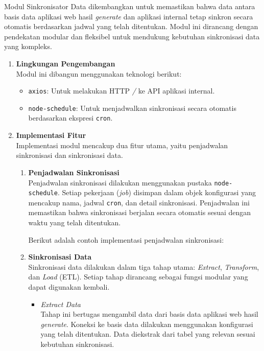 Modul Sinkronisator Data dikembangkan untuk memastikan bahwa data antara basis data aplikasi web hasil \textit{generate} dan aplikasi internal tetap sinkron secara otomatis berdasarkan jadwal yang telah ditentukan. Modul ini dirancang dengan pendekatan modular dan fleksibel untuk mendukung kebutuhan sinkronisasi data yang kompleks.

\begin{enumerate}[label*=\arabic*.,ref=\arabic*]
    \item \textbf{Lingkungan Pengembangan}\\
    Modul ini dibangun menggunakan teknologi berikut:
    \begin{itemize}
        \item \texttt{axios}: Untuk melakukan HTTP \textit{/} ke API aplikasi internal.
        \item \texttt{node-schedule}: Untuk menjadwalkan sinkronisasi secara otomatis berdasarkan ekspresi \texttt{cron}.
    \end{itemize}

    \item \textbf{Implementasi Fitur}\\
    Implementasi modul mencakup dua fitur utama, yaitu penjadwalan sinkronisasi dan sinkronisasi data.
        \begin{enumerate}[label=\alph*.]
            \item \textbf{Penjadwalan Sinkronisasi}\\
            Penjadwalan sinkronisasi dilakukan menggunakan pustaka \texttt{node-schedule}. Setiap pekerjaan (\textit{job}) disimpan dalam objek konfigurasi yang mencakup nama, jadwal \texttt{cron}, dan detail sinkronisasi. Penjadwalan ini memastikan bahwa sinkronisasi berjalan secara otomatis sesuai dengan waktu yang telah ditentukan.

            Berikut adalah contoh implementasi penjadwalan sinkronisasi:
            

            \item \textbf{Sinkronisasi Data}\\
            Sinkronisasi data dilakukan dalam tiga tahap utama: \textit{Extract}, \textit{Transform}, dan \textit{Load} (ETL). Setiap tahap dirancang sebagai fungsi modular yang dapat digunakan kembali.

                \begin{itemize}
                    \item \textit{Extract Data}\\
                    Tahap ini bertugas mengambil data dari basis data aplikasi web hasil \textit{generate}. Koneksi ke basis data dilakukan menggunakan konfigurasi yang telah ditentukan. Data diekstrak dari tabel yang relevan sesuai kebutuhan sinkronisasi.


\end{itemize}
\end{enumerate}
\end{enumerate}
